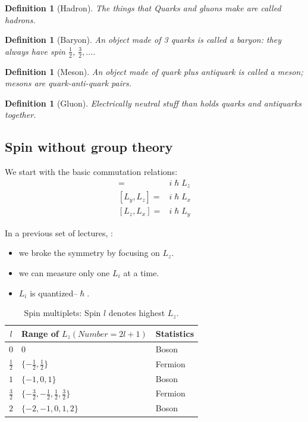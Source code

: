 \documentclass[]{article}
\newtheorem{defn}[thm]{Definition}
\begin{document}
\begin{defn}[Hadron]
	The things that Quarks and gluons make are called hadrons.
\end{defn}



\begin{defn}[Baryon]
	An object made of 3 quarks is called a baryon: they always have spin $\frac{1}{2}$, $\frac{3}{2},...$.
\end{defn}

\begin{defn}[Meson]
	An object made of quark plus antiquark is called a meson; mesons are quark-anti-quark pairs.
\end{defn}

\begin{defn}[Gluon]
	Electrically neutral stuff than holds quarks and antiquarks together.
\end{defn}

\subsection{Spin without group theory}
We start with the basic commutation relations:\cite{susskind2009particles}
\begin{align*}
	[L_x,L_y] =& i \hslash L_z\\
	[L_y,L_z] =& i \hslash L_x\\
	[L_z,L_x] =& i \hslash L_y
\end{align*}

In a previous set of lectures, \cite{susskind2009particles}:

\begin{itemize}
	\item we broke the symmetry by focusing on $L_z$.
	\item we can measure only one $L_i$ at a time.
	\item $L_i$ is quantized--$\hslash$.
\end{itemize}

\begin{table}[H]
	\begin{center}
		\caption{Spin multiplets: Spin $l$ denotes highest $L_z$.}
		\begin{tabular}{|c|l|l|} \hline
		$l$&Range of $L_z (Number=2l+1)$&Statistics\\ \hline
		$0$&$0$& Boson\\ \hline
		$\frac{1}{2}$&$\{-\frac{1}{2},\frac{1}{2}\}$& Fermion\\ \hline
		$1$&$\{-1,0,1\}$&Boson \\ \hline
		$\frac{3}{2}$&$\{-\frac{3}{2},-\frac{1}{2},\frac{1}{2},\frac{3}{2}\}$&Fermion \\ \hline
		$2$&$\{-2,-1,0,1,2\}$&Boson \\ \hline
		\end{tabular}
	\end{center}
\end{table}
\end{document}
